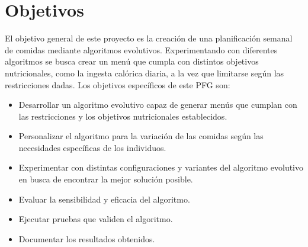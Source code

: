 \section{Objetivos}
\label{ch:objetivos}

El objetivo general de este proyecto es la creación de una planificación semanal de comidas mediante algoritmos evolutivos. Experimentando con diferentes algoritmos se busca crear un menú que cumpla con distintos objetivos nutricionales, como la ingesta calórica diaria, a la vez que limitarse según las restricciones dadas. Los objetivos específicos de este PFG son:

\begin{itemize}
    \item Desarrollar un algoritmo evolutivo capaz de generar menús que cumplan con las restricciones y los objetivos nutricionales establecidos.
    \item Personalizar el algoritmo para la variación de las comidas según las necesidades específicas de los individuos.
    \item Experimentar con distintas configuraciones y variantes del algoritmo evolutivo en busca de encontrar la mejor solución posible.
    \item Evaluar la sensibilidad y eficacia del algoritmo.
    \item Ejecutar pruebas que validen el algoritmo.
    \item Documentar los resultados obtenidos.
\end{itemize}

